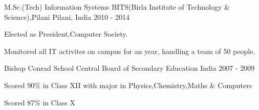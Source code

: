 \begin{cventries}
  \cventry
    {M.Sc.(Tech) Information Systems}
    {BITS(Birla Institute of Technology \& Science),Pilani}
    {Pilani, India}
    {2010 - 2014}
     {
      \begin{cvitems}
        \item {Elected as President,Computer Society. }
        \item {Monitored all IT activites on campus for an year, handling a team of 50 people.}
      \end{cvitems}
     }
     
  \cventry
    {Bishop Conrad School}
    {Central Board of Secondary Education}
    { India}
    {2007 - 2009}
     {
      \begin{cvitems}
        \item {Scored 90\% in Class XII with major in Physics,Chemistry,Maths \& Computers
 }
        \item {Scored 87\% in Class X}
      \end{cvitems}
     }
\end{cventries}
